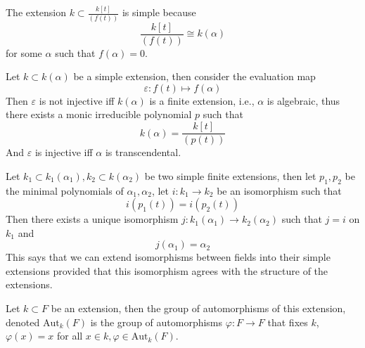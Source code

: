 \documentclass[openany]{book}
\begin{document}
\begin{example}
    The extension $k\subset\frac{k[t]}{(f(t))}$ is simple because 
    \begin{equation*}
        \frac{k[t]}{(f(t))}\cong k(\alpha)
    \end{equation*}
    for some $\alpha$ such that $f(\alpha)=0$.
\end{example}




\begin{prop}
    Let $k\subset k(\alpha)$ be a simple extension, then consider the evaluation map 
    \begin{equation*}
        \varepsilon: f(t)\mapsto f(\alpha)
    \end{equation*}
    Then $\varepsilon$ is not injective iff $k(\alpha)$ is a finite extension, i.e., $\alpha$ is algebraic, thus there exists a monic irreducible polynomial $p$ such that 
    \begin{equation*}
        k(\alpha)=\frac{k[t]}{(p(t))}
    \end{equation*}
    And $\varepsilon$ is injective iff $\alpha$ is transcendental.
\end{prop}


\begin{prop}[lifting]
    Let $k_1\subset k_1(\alpha_1), k_2\subset k(\alpha_2)$ be two simple finite extensions, then let $p_1,p_2$ be the minimal polynomials of $\alpha_1,\alpha_2$, let $i: k_1\to k_2$ be an isomorphism such that 
    \begin{equation*}
        i(p_1(t))=i(p_2(t))
    \end{equation*}
    Then there exists a unique isomorphism $j: k_1(\alpha_1)\to k_2(\alpha_2)$ such that $j=i$ on $k_1$ and 
    \begin{equation*}
        j(\alpha_1)=\alpha_2
    \end{equation*}
    This says that we can extend isomorphisms between fields into their simple extensions provided that this isomorphism agrees with the structure of the extensions.
\end{prop}


\begin{defn}
    Let $k\subset F$ be an extension, then the group of automorphisms of this extension, denoted $\text{Aut}_k(F)$ is the group of automorphisms $\varphi:F\to F$ that fixes $k$, $\varphi(x)=x$ for all $x\in k, \varphi\in\text{Aut}_k(F)$.
\end{defn}
\end{document}
